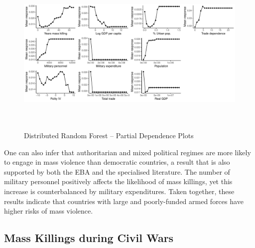 \begin{figure}[H]
    \centering
    \includegraphics[width=\textwidth, height=8cm]{images/rf-mk-pd.pdf}
    \caption{Distributed Random Forest -- Partial Dependence Plots}
    \label{fig:drfdpp}
\end{figure}

One can also infer that authoritarian and mixed political regimes are more likely to engage in mass violence than democratic countries, a result that is also supported by both the EBA and the specialised literature. The number of military personnel positively affects the likelihood of mass killings, yet this increase is counterbalanced by military expenditures. Taken together, these results indicate that countries with large and poorly-funded armed forces have higher risks of mass violence.

\subsection{Mass Killings during Civil Wars}%
\label{sub:mass_killings_during_civil_wars}

